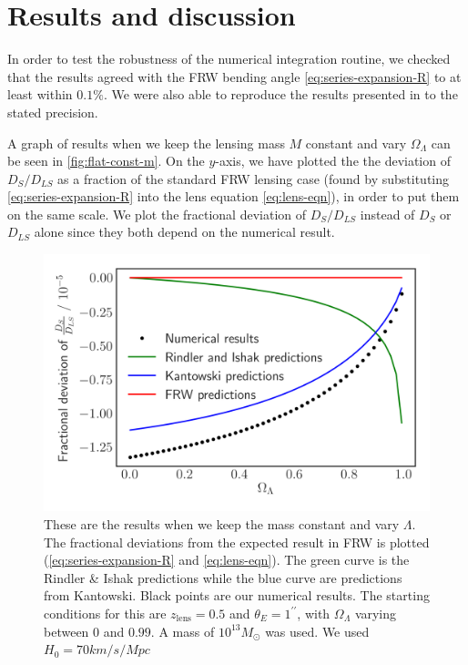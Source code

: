 \chapter{Results and discussion}
\label{chapter:results}

In order to test the robustness of the numerical integration routine, we checked that the results agreed with the FRW bending angle \autoref{eq:series-expansion-R} to at least within $0.1\%$. We were also able to reproduce the results presented in \citet{schucker2009strong} to the stated precision. 

A graph of results when we keep the lensing mass $M$ constant and vary $\Omega_{\Lambda}$ can be seen in \autoref{fig:flat-const-m}. On the $y$-axis, we have plotted the the deviation of $D_{S}/D_{LS}$ as a fraction of the standard FRW lensing case (found by substituting \autoref{eq:series-expansion-R} into the lens equation \ref{eq:lens-eqn}), in order to put them on the same scale. We plot the fractional deviation of $D_{S}/D_{LS}$ instead of $D_S$ or $D_{LS}$ alone since they both depend on the numerical result. 

\begin{figure}
  \centering
  \includegraphics[height=0.5\linewidth]{images/flat.png}
  \caption{These are the results when we keep the mass constant and vary $\Lambda$. The fractional deviations from the expected result in FRW is plotted (\autoref{eq:series-expansion-R} and \autoref{eq:lens-eqn}). The green curve is the Rindler \& Ishak predictions while the blue curve are predictions from Kantowski. Black points are our numerical results. The starting conditions for this are $z_{\text{lens}} = 0.5$ and $\theta_E = 1^{\prime\prime}$, with $\Omega_{\Lambda}$ varying between $0$ and $0.99$. A mass of $10^{13}M_{\odot}$ was used. We used $H_0 = 70 km/s/Mpc$}
  \label{fig:flat-const-m}
\end{figure}

